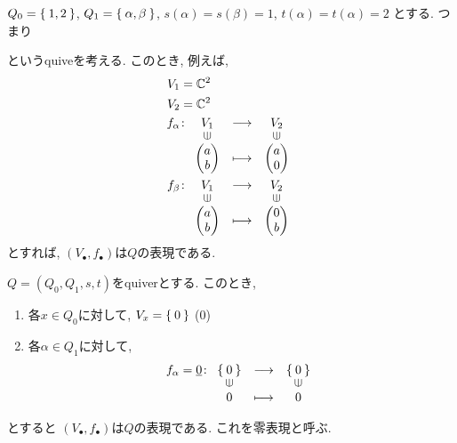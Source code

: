 \begin{example}
  $Q_0=\Set{1,2}$,
  $Q_1=\Set{\alpha,\beta}$,
  $s(\alpha)=s(\beta)=1$,
  $t(\alpha)=t(\alpha)=2$
  とする.
  つまり
  \begin{center}
  \end{center}
  というquiveを考える.
  このとき,
  例えば,
  \begin{align*}
    V_1&=\CC^2\\
    V_2&=\CC^2\\
    f_\alpha&\colon
    \Shazo{V_1}{V_2}
    {\begin{pmatrix}a\\b\end{pmatrix}}
    {\begin{pmatrix}a\\0\end{pmatrix}}\\
    f_\beta&\colon
    \Shazo{V_1}{V_2}
    {\begin{pmatrix}a\\b\end{pmatrix}}
    {\begin{pmatrix}0\\b\end{pmatrix}}
  \end{align*}
  とすれば,
  $(V_\bullet,f_\bullet)$は$Q$の表現である.
\end{example}

\begin{example}
  $Q=(Q_0,Q_1,s,t)$をquiverとする.
  このとき,
  \begin{enumerate}
  \item 各$x\in Q_0$に対して, $V_x=\Set{0}$ ($0$)
  \item 各$\alpha\in Q_1$に対して,
    \begin{align*}
      f_\alpha = \underline{0} \colon
      \Shazo{\Set{0}}{\Set{0}}
      {0}{0}
    \end{align*}
  \end{enumerate}
  とすると
  $(V_\bullet,f_\bullet)$は$Q$の表現である.
  これを零表現と呼ぶ.
\end{example}

